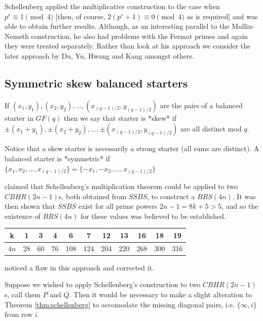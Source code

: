 \documentclass[
  11pt,
  a4paper]{book}\usepackage[]{graphicx}\usepackage[]{xcolor}
\begin{document}
Schellenberg applied the multiplicative construction to the
case when $p^r \equiv 1\pmod 4$ [then, of course,
$2(p^r + 1) \equiv 0\pmod 4$ as is required] and was able to
obtain further results. Although, as an interesting parallel
to the Mullin-Nemeth construction, he also had problems with
the Fermat primes and again they were treated separately.
Rather than look at his approach we consider the later
approach by Du, Yu, Hwang and Kang amongst others.

\subsection{Symmetric skew balanced starters}

If $(x_1, y_1), (x_2, y_2),\ldots, (x_{(q - 1)/2}, y_{(q - 1)/2})$
are the pairs of a balanced starter in $GF(q)$ then we say
that starter is *skew* if
$\pm(x_1 + y_1), \pm(x_2 + y_2),\ldots, \pm(x_{(q - 1)/2}, y_{(q - 1)/2})$
are all distinct mod $q$.

Notice that a skew starter is necessarily a strong starter
(all sums are distinct).  A balanced starter is *symmetric* if
$\{x_1, x_2,\ldots, x_{(q - 1)/2}\} = \{-x_1, -x_2,\ldots, x_{(q - 1)/2}\}$

\cite{hwangCompleteBalancedHowell1984}
claimed that Schellenberg’s multiplication
theorem could be applied to two $CBHR(2n - 1)$s, both obtained
from $SSBS$, to construct a $BRS(4n)$. It was then shown
that $SSBS$ exist for all prime powers $2n - 1 = 8k + 5 > 5$,
and so the existence of $BRS(4n)$ for these values was
believed to be established.

\begin{center}
\begin{tabular}{|c|c|c|c|c|c|c|c|c|c|c|}
\hline
  k  &  1 &  3 &  4 &   6 &   7 &  12 &  13 &  16 &  18 & 19 \\ \hline
$4n$ & 28 & 60 & 76 & 108 & 124 & 204 & 220 & 268 & 300 & 316 \\ \hline
\end{tabular}
\end{center}

\cite{andersonConstructionBalancedRoom1999}
noticed a flaw in this approach and corrected it.

Suppose we wished to apply Schellenberg’s
construction to two $CBHR(2n - 1)$s, call them $P$ and $Q$.
Then it would be necessary to make a slight alteration to
Theorem \ref{thm:schellenberg} to accomodate the missing
diagonal pairs, i.e. $\{\infty, i\}$ from row $i$.
\end{document}
